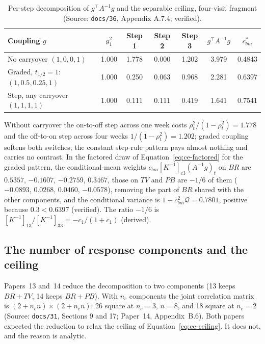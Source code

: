\documentclass[11pt]{article}
\newcommand{\code}[1]{\texttt{#1}}
\begin{document}
\begin{table}[h]
\centering\small
\caption{Per-step decomposition of $g^\top A^{-1}g$ and the separable
ceiling, four-visit fragment (Source: \code{docs/36}, Appendix A.7.4;
verified).}
\label{tab:inve-steps}
\begin{tabular}{@{}lcccccc@{}}
\toprule
Coupling $g$ & $g_1^2$ & Step 1 & Step 2 & Step 3 & $g^\top A^{-1}g$ & $c_{bm}^{\ast}$ \\
\midrule
No carryover $(1, 0, 0, 1)$ & 1.000 & 1.778 & 0.000 & 1.202 & 3.979 & 0.4843 \\
Graded, $t_{1/2} = 1$: $(1, 0.5, 0.25, 1)$ & 1.000 & 0.250 & 0.063 & 0.968 & 2.281 & 0.6397 \\
Step, any carryover $(1, 1, 1, 1)$ & 1.000 & 0.111 & 0.111 & 0.419 & 1.641 & 0.7541 \\
\bottomrule
\end{tabular}
\end{table}

Without carryover the on-to-off step across one week costs
$\rho_t^2/(1-\rho_t^2) = 1.778$ and the off-to-on step across four weeks
$1/(1-\rho_t^2) = 1.202$; graded coupling softens both switches; the
constant step-rule pattern pays almost nothing and carries no contrast.
In the factored draw of Equation~\eqref{eq:ce-factored} for the graded
pattern, the conditional-mean weights
$c_{bm}[K^{-1}]_{c3}(A^{-1}g)_t$ on $BR$ are $0.5357$, $-0.1607$,
$-0.2759$, $0.3467$, those on $TV$ and $PB$ are $-1/6$ of them
($-0.0893$, $0.0268$, $0.0460$, $-0.0578$), removing the part of $BR$
shared with the other components, and the conditional variance is
$1 - c_{bm}^2\mathcal Q = 0.7801$, positive because $0.3 < 0.6397$ (verified).
The ratio $-1/6$ is $[K^{-1}]_{13}/[K^{-1}]_{33} = -c_1/(1+c_1)$
(derived).

\subsection{The number of response components and the ceiling}
\label{sec:invc-ce-K}

Papers~13 and~14 reduce the decomposition to two components (13 keeps
$BR + TV$, 14 keeps $BR + PB$). With $n_c$ components the joint
correlation matrix is $(2 + n_c n) \times (2 + n_c n)$: 26 square at
$n_c = 3$, $n = 8$, and 18 square at $n_c = 2$ (Source: \code{docs/31},
Sections 9 and 17; Paper~14, Appendix~B.6). Both papers expected the
reduction to relax the ceiling of Equation~\eqref{eq:ce-ceiling}. It
does not, and the reason is analytic.
\end{document}
